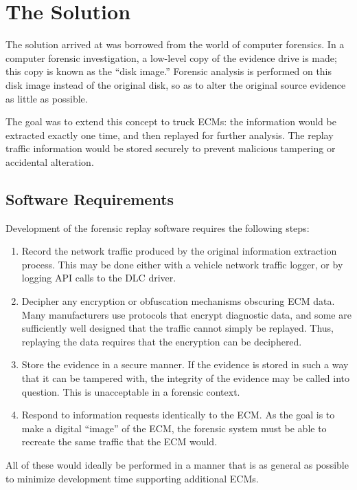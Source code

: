 \section{The Solution}
The solution arrived at was borrowed from the world of computer forensics. In a computer forensic investigation,
a low-level copy of the evidence drive is made; this copy is known as the ``disk image.'' Forensic analysis
is performed on this disk image instead of the original disk, so as to alter the original source evidence as
little as possible.

The goal was to extend this concept to truck ECMs: the information would be extracted exactly one time, and then
replayed for further analysis. The replay traffic information would be stored securely to prevent malicious tampering
or accidental alteration.

\subsection{Software Requirements}

Development of the forensic replay software requires the following steps:

\begin{enumerate}
  \item Record the network traffic produced by the original information extraction process. This may be done either with a vehicle
        network traffic logger, or by logging API calls to the DLC driver.
  \item Decipher any encryption or obfuscation mechanisms obscuring ECM data. Many manufacturers use protocols that encrypt diagnostic
        data, and some are sufficiently well designed that the traffic cannot simply be replayed. Thus, replaying the data requires
        that the encryption can be deciphered.
  \item Store the evidence in a secure manner. If the evidence is stored in such a way that it can be tampered with, the integrity of
        the evidence may be called into question. This is unacceptable in a forensic context.
  \item Respond to information requests identically to the ECM. As the goal is to make a digital ``image'' of the ECM, the forensic system
        must be able to recreate the same traffic that the ECM would.
\end{enumerate}

All of these would ideally be performed in a manner that is as general as possible to minimize development time
supporting additional ECMs.

